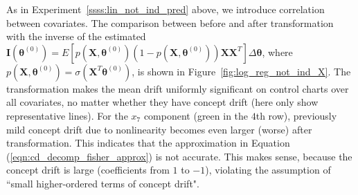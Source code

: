 \documentclass[twoside,11pt]{article}
\begin{document}
\begin{appendix}
\begin{enumerate}[(I)]
As in Experiment~\ref{ssss:lin_not_ind_pred} above, we introduce correlation between {covariates.} The comparison between before and after transformation with {the inverse of the estimated} {$\mathbf {I} ( {\bm{\theta}} ^{ (0)}) = E [{p} (\bm {X},\bm { \theta} ^{ (0)}) (1-{p}(\bm {X},\bm { \theta} ^{ (0)})) \bm {X} \bm {X}^T] \Delta \bm{ \theta}$}, where {$p (\bm {X},\bm { \theta} ^{ (0)}) = \sigma ( \bm {X}^T\bm { \theta} ^{ (0)})$}, is shown in Figure~\ref{fig:log_reg_not_ind_X}. The transformation makes the mean {drift} uniformly significant on control charts over all {covariates,} no matter whether they have concept drift (here only show representative lines). For the $x_7$ component (green in the $4$th row), previously mild concept drift due to nonlinearity becomes even larger (worse) after transformation. This indicates that the approximation in Equation (\ref{eqn:cd_decomp_fisher_approx}) is not accurate. This makes sense, because the concept drift is large (coefficients from $1$ to $-1$), violating the assumption of ``small higher-ordered terms of concept drift".


\end{enumerate}
\end{appendix}
\end{document}
